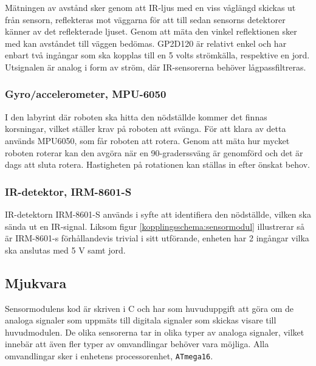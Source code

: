 \documentclass[11pt]{article}
\begin{document}
\begin{flushleft}
Mätningen av avstånd sker genom att IR-ljus med en viss våglängd skickas ut från sensorn, reflekteras mot väggarna för att till sedan sensorns detektorer känner av det reflekterade ljuset. Genom att mäta den vinkel reflektionen sker med kan avståndet till väggen bedömas. GP2D120 är relativt enkel och har enbart två ingångar som ska kopplas till en 5 volts strömkälla, respektive en jord.  Utsignalen är analog i form av ström, där IR-sensorerna behöver lågpassfiltreras.

\subsubsection{Gyro/accelerometer, MPU-6050}
I den labyrint där roboten ska hitta den nödställde kommer det finnas korsningar, vilket ställer krav på roboten att svänga. För att klara av detta används MPU6050, som får roboten att rotera. Genom att mäta hur mycket roboten roterar kan den avgöra när en 90-graderssväng är genomförd och det är dags att sluta rotera. Hastigheten på rotationen kan ställas in efter önskat behov.



 
\subsubsection{IR-detektor, IRM-8601-S}
IR-detektorn IRM-8601-S används i syfte att identifiera den nödställde, vilken ska sända ut en IR-signal. Liksom figur \ref{kopplingsschema:sensormodul} illustrerar så är IRM-8601-s förhållandevis trivial i sitt utförande, enheten har 2 ingångar vilka ska anslutas med 5 V samt jord. 




\subsection{Mjukvara}
Sensormodulens kod är skriven i C och har som huvuduppgift att göra om de analoga signaler som uppmäts till digitala signaler som skickas visare till huvudmodulen. De olika sensorerna tar in olika typer av analoga signaler, vilket innebär att även fler typer av omvandlingar behöver vara möjliga. Alla omvandlingar sker i enhetens processorenhet, \verb+ATmega16+. 


\end{flushleft}
\end{document}
